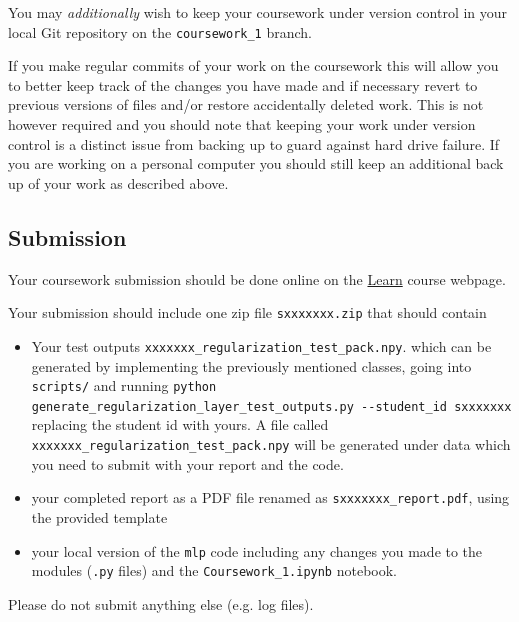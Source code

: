 \documentclass[11pt,]{article}
\begin{document}
You may \emph{additionally} wish to keep your coursework under version
control in your local Git repository on the \verb+coursework_1+ branch.

If you make regular commits of your work on the coursework this will
allow you to better keep track of the changes you have made and if
necessary revert to previous versions of files and/or restore
accidentally deleted work. This is not however required and you should
note that keeping your work under version control is a distinct issue
from backing up to guard against hard drive failure. If you are working
on a personal computer you should still keep an additional back up of
your work as described above.



\subsection{Submission}
\label{sec:submission}

Your coursework submission should be done online on the \href{https://www.learn.ed.ac.uk/}{Learn} course webpage.

Your submission should include one zip file \texttt{sxxxxxxx.zip} that should contain

\begin{itemize}

\item Your test outputs \texttt{xxxxxxx\_regularization\_test\_pack.npy}. which can be generated by implementing the previously mentioned classes, going into \texttt{scripts/} and running \texttt{python generate\_regularization\_layer\_test\_outputs.py -{}-student\_id sxxxxxxx} replacing the student id with yours. A file called \texttt{xxxxxxx\_regularization\_test\_pack.npy} will be generated under data which you need to submit with your report and the code.
\item
  your completed report as a PDF file renamed as \texttt{sxxxxxxx\_report.pdf}, using the provided template
\item
  your local version of the \texttt{mlp} code including any changes
  you made to the modules (\texttt{.py} files) and the \texttt{Coursework\_1.ipynb} notebook.   
\end{itemize}
Please do not submit anything else (e.g. log files).
\end{document}
